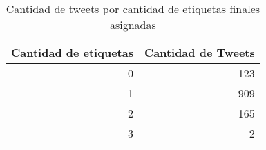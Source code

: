 \begin{table}[!htbp]
\centering
\begin{tabular}{rr}
\toprule
Cantidad de etiquetas & Cantidad de Tweets \\
\midrule
0 & 123 \\
1 & 909 \\
2 & 165 \\
3 & 2 \\
\bottomrule
\end{tabular}
\caption{Cantidad de tweets por cantidad de etiquetas finales asignadas}
\label{table:labels_counts}
\end{table}
